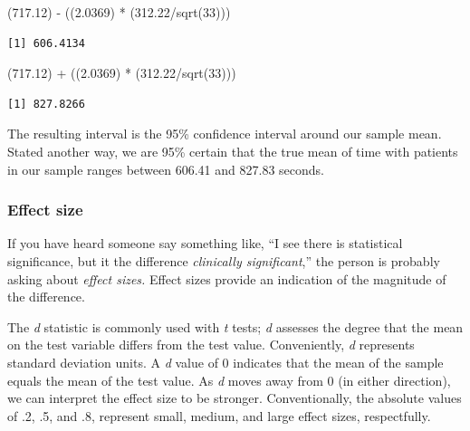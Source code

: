 \documentclass[
  11pt,
]{book}
\newenvironment{Shaded}{\begin{snugshade}}{\end{snugshade}}
\newcommand{\DecValTok}[1]{\textcolor[rgb]{0.00,0.00,0.81}{#1}}
\newcommand{\FloatTok}[1]{\textcolor[rgb]{0.00,0.00,0.81}{#1}}
\newcommand{\FunctionTok}[1]{\textcolor[rgb]{0.00,0.00,0.00}{#1}}
\newcommand{\NormalTok}[1]{#1}
\newcommand{\SpecialCharTok}[1]{\textcolor[rgb]{0.00,0.00,0.00}{#1}}
\begin{document}
\begin{Shaded}
\begin{Highlighting}[]
\NormalTok{(}\FloatTok{717.12}\NormalTok{) }\SpecialCharTok{{-}}\NormalTok{ ((}\FloatTok{2.0369}\NormalTok{) }\SpecialCharTok{*}\NormalTok{ (}\FloatTok{312.22}\SpecialCharTok{/}\FunctionTok{sqrt}\NormalTok{(}\DecValTok{33}\NormalTok{)))}
\end{Highlighting}
\end{Shaded}

\begin{verbatim}
[1] 606.4134
\end{verbatim}

\begin{Shaded}
\begin{Highlighting}[]
\NormalTok{(}\FloatTok{717.12}\NormalTok{) }\SpecialCharTok{+}\NormalTok{ ((}\FloatTok{2.0369}\NormalTok{) }\SpecialCharTok{*}\NormalTok{ (}\FloatTok{312.22}\SpecialCharTok{/}\FunctionTok{sqrt}\NormalTok{(}\DecValTok{33}\NormalTok{)))}
\end{Highlighting}
\end{Shaded}

\begin{verbatim}
[1] 827.8266
\end{verbatim}

The resulting interval is the 95\% confidence interval around our sample mean. Stated another way, we are 95\% certain that the true mean of time with patients in our sample ranges between 606.41 and 827.83 seconds.

\hypertarget{effect-size}{%
\subsubsection{Effect size}\label{effect-size}}

If you have heard someone say something like, ``I see there is statistical significance, but it the difference \emph{clinically significant},'' the person is probably asking about \emph{effect sizes.} Effect sizes provide an indication of the magnitude of the difference.

The \emph{d} statistic is commonly used with \emph{t} tests; \emph{d} assesses the degree that the mean on the test variable differs from the test value. Conveniently, \emph{d} represents standard deviation units. A \emph{d} value of 0 indicates that the mean of the sample equals the mean of the test value. As \emph{d} moves away from 0 (in either direction), we can interpret the effect size to be stronger. Conventionally, the absolute values of .2, .5, and .8, represent small, medium, and large effect sizes, respectfully.
\end{document}
